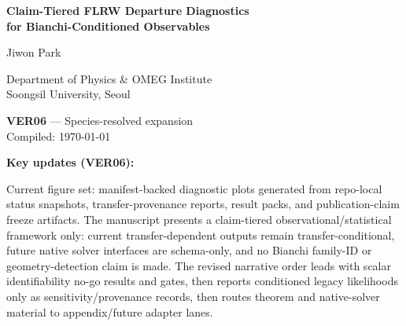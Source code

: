 \documentclass[12pt,a4paper]{report}
\begin{document}
\begin{titlepage}
\centering
\vspace*{3cm}
{\Huge\bfseries Claim-Tiered FLRW Departure Diagnostics\\[0.5em]
for Bianchi-Conditioned Observables\par}
\vspace{2cm}
{\Large Jiwon Park\par}
{\large Department of Physics \& OMEG Institute\\
Soongsil University, Seoul\par}
\vspace{1.5cm}
{\large \textbf{VER06} — Species-resolved expansion\\
Compiled: \today\par}
\vspace{1cm}
{\normalsize
\textbf{Key updates (VER06):}


Current figure set: manifest-backed diagnostic plots generated from
repo-local status snapshots, transfer-provenance reports, result packs,
and publication-claim freeze artifacts.  The manuscript presents a
claim-tiered observational/statistical framework only: current
transfer-dependent outputs remain transfer-conditional, future native
solver interfaces are schema-only, and no Bianchi family-ID or
geometry-detection claim is made.  The revised narrative order leads
with scalar identifiability no-go results and gates, then reports
conditioned legacy likelihoods only as sensitivity/provenance records,
then routes theorem and native-solver material to appendix/future
adapter lanes.\par}
\end{titlepage}


\newcommand{\phantomlabel}[1]{\phantomsection\label{#1}}
\tableofcontents
\clearpage






\end{document}
